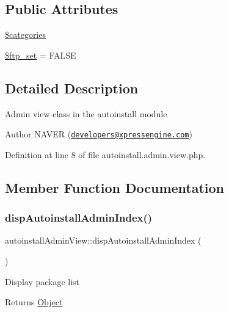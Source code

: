 \subsection*{Public Attributes}
\begin{DoxyCompactItemize}
\item 
\hyperlink{classautoinstallAdminView_aa2f6b16960f2a51acaf622480024e2a4}{\$categories}
\item 
\hyperlink{classautoinstallAdminView_a2b4389cba13f2fc27c57adb8b597a56f}{\$ftp\+\_\+set} = F\+A\+L\+SE
\end{DoxyCompactItemize}


\subsection{Detailed Description}
Admin view class in the autoinstall module \begin{DoxyAuthor}{Author}
N\+A\+V\+ER (\href{mailto:developers@xpressengine.com}{\tt developers@xpressengine.\+com}) 
\end{DoxyAuthor}


Definition at line 8 of file autoinstall.\+admin.\+view.\+php.



\subsection{Member Function Documentation}
\mbox{\label{classautoinstallAdminView_af3c3bcabc77b8e0d812db60bfc8bc621}} 
\subsubsection{\texorpdfstring{disp\+Autoinstall\+Admin\+Index()}{dispAutoinstallAdminIndex()}}
{\footnotesize\ttfamily autoinstall\+Admin\+View\+::disp\+Autoinstall\+Admin\+Index (\begin{DoxyParamCaption}{ }\end{DoxyParamCaption})}

Display package list

\begin{DoxyReturn}{Returns}
\hyperlink{classObject}{Object} 
\end{DoxyReturn}


